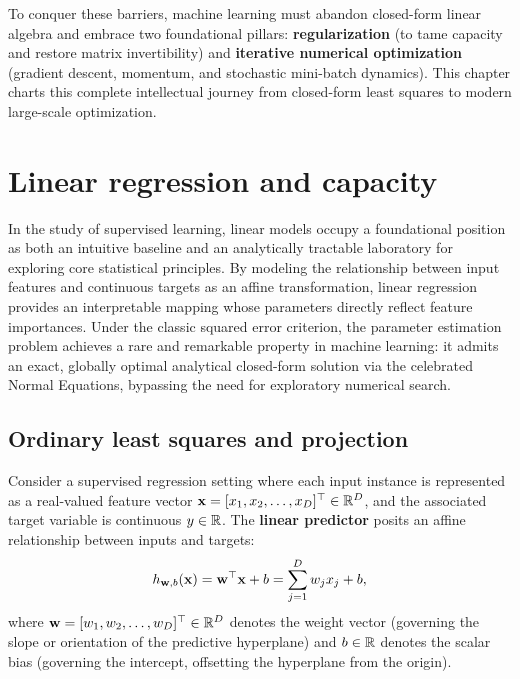 To conquer these barriers, machine learning must abandon closed-form linear algebra and embrace two foundational pillars: \textbf{regularization} (to tame capacity and restore matrix invertibility) and \textbf{iterative numerical optimization} (gradient descent, momentum, and stochastic mini-batch dynamics). This chapter charts this complete intellectual journey from closed-form least squares to modern large-scale optimization.

\section{Linear regression and capacity}
\label{sec:linear_regression_and_capacity}

In the study of supervised learning, linear models occupy a foundational position as both an intuitive baseline and an analytically tractable laboratory for exploring core statistical principles. By modeling the relationship between input features and continuous targets as an affine transformation, linear regression provides an interpretable mapping whose parameters directly reflect feature importances. Under the classic squared error criterion, the parameter estimation problem achieves a rare and remarkable property in machine learning: it admits an exact, globally optimal analytical closed-form solution via the celebrated Normal Equations, bypassing the need for exploratory numerical search.

\subsection{Ordinary least squares and projection}
\label{sec:ols_and_normal_equations}
\label{sec:linear_predictor_formulation}
\label{sec:ols_and_mle}
\label{sec:normal_equations_derivation}
\label{sec:geometric_projection_ols}
\label{sec:ols_computational_complexity}

Consider a supervised regression setting where each input instance is represented as a real-valued feature vector $\mathbf{x} = [x_1, x_2, \dots, x_D]^\top \in \mathbb{R}^D$, and the associated target variable is continuous $y \in \mathbb{R}$. The \textbf{linear predictor} posits an affine relationship between inputs and targets:
\begin{equation}
h_{\mathbf{w}, b}(\mathbf{x}) = \mathbf{w}^\top \mathbf{x} + b = \sum_{j=1}^D w_j x_j + b,
\label{eq:linear_predictor_affine}
\end{equation}
where $\mathbf{w} = [w_1, w_2, \dots, w_D]^\top \in \mathbb{R}^D$ denotes the weight vector (governing the slope or orientation of the predictive hyperplane) and $b \in \mathbb{R}$ denotes the scalar bias (governing the intercept, offsetting the hyperplane from the origin).

